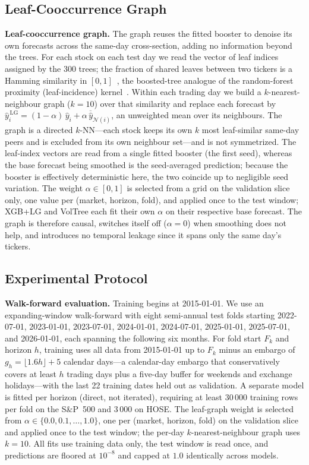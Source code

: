 \documentclass[runningheads,a4paper]{llncs}
\begin{document}
\subsection{Leaf-Cooccurrence Graph}
\textbf{Leaf-cooccurrence graph.} The graph reuses the fitted booster to denoise its own forecasts across
the same-day cross-section, adding no information beyond the trees. For each stock on each test day we read
the vector of leaf indices assigned by the 300 trees; the fraction of shared leaves between two tickers is
a Hamming similarity in $[0,1]$~\cite{chen2016}, the boosted-tree analogue of the random-forest proximity
(leaf-incidence) kernel~\cite{rhodes2023}. Within each trading day we build a $k$-nearest-neighbour graph
($k=10$) over that similarity and replace each forecast by
$\hat y_i^{\,\mathrm{LG}}=(1-\alpha)\,\hat y_i+\alpha\,\overline{\hat y}_{\mathcal{N}(i)}$, an unweighted
mean over its neighbours. The graph is a directed $k$-NN---each stock keeps its own $k$ most leaf-similar
same-day peers and is excluded from its own neighbour set---and is not symmetrized. The leaf-index vectors
are read from a single fitted booster (the first seed), whereas the base forecast being smoothed is the
seed-averaged prediction; because the booster is effectively deterministic here, the two coincide up to
negligible seed variation. The weight $\alpha\in[0,1]$ is selected from a grid on the validation slice only,
one value per (market, horizon, fold), and applied once to the test window; XGB+LG and VolTree each fit
their own $\alpha$ on their respective base forecast. The graph is therefore causal, switches itself off
($\alpha=0$) when smoothing does not help, and introduces no temporal leakage since it spans only the same
day's tickers.

\subsection{Experimental Protocol}
\textbf{Walk-forward evaluation.} Training begins at 2015-01-01. We use an expanding-window walk-forward
with eight semi-annual test folds starting 2022-07-01, 2023-01-01, 2023-07-01, 2024-01-01, 2024-07-01,
2025-01-01, 2025-07-01, and 2026-01-01, each spanning the following six months. For fold start $F_k$ and
horizon $h$, training uses all data from 2015-01-01 up to $F_k$ minus an embargo of
$g_h=\lfloor 1.6h\rfloor+5$ calendar days---a calendar-day embargo that conservatively covers at least $h$
trading days plus a five-day buffer for weekends and exchange holidays---with the last 22 training dates
held out as validation. A
separate model is fitted per horizon (direct, not iterated), requiring at least 30\,000 training rows per
fold on the S\&P~500 and 3\,000 on HOSE. The leaf-graph weight is selected from
$\alpha\in\{0.0,0.1,\dots,1.0\}$, one per (market, horizon, fold) on the validation slice and applied once
to the test window; the per-day $k$-nearest-neighbour graph uses $k=10$. All fits use training data only,
the test window is read once, and predictions are floored at $10^{-8}$ and capped at $1.0$ identically
across models.
\end{document}
